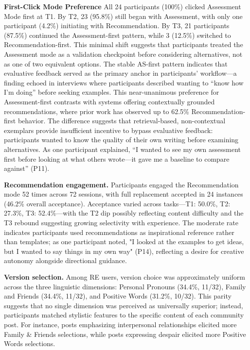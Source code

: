 \documentclass[]{llncs}
\begin{document}
\textbf{First-Click Mode Preference}
All 24 participants (100\%) clicked Assessment Mode first at T1. By T2, 23 (95.8\%) still began with Assessment, with only one participant (4.2\%) initiating with Recommendation. By T3, 21 participants (87.5\%) continued the Assessment-first pattern, while 3 (12.5\%) switched to Recommendation-first. This minimal shift suggests that participants treated the Assessment mode as a validation checkpoint before considering alternatives, not as one of two equivalent options. The stable AS-first pattern indicates that evaluative feedback served as the primary anchor in participants’ workflow—a finding echoed in interviews where participants described wanting to “know how I’m doing” before seeking examples.
This near-unanimous preference for Assessment-first contrasts with systems offering contextually grounded recommendations, where prior work has observed up to 62.5\% Recommendation-first behavior. The difference suggests that retrieval-based, non-contextual exemplars provide insufficient incentive to bypass evaluative feedback: participants wanted to know the quality of their own writing before examining alternatives. As one participant explained, “I wanted to see my own assessment first before looking at what others wrote—it gave me a baseline to compare against” (P11).

\textbf{Recommendation engagement.} Participants engaged the Recommendation mode 52 times across 72 sessions, with full replacement accepted in 24 instances (46.2\% overall acceptance). Acceptance varied across tasks—T1: 50.0\%, T2: 27.3\%, T3: 52.4\%—with the T2 dip possibly reflecting content difficulty and the T3 rebound suggesting growing selectivity with experience. The moderate rate indicates participants used recommendations as inspirational reference rather than templates; as one participant noted, "I looked at the examples to get ideas, but I wanted to say things in my own way" (P14), reflecting a desire for creative autonomy alongside directional guidance.

\textbf{Version selection.} Among RE users, version choice was approximately uniform across the three linguistic dimensions: Personal Pronouns (34.4\%, 11/32), Family and Friends (34.4\%, 11/32), and Positive Words (31.2\%, 10/32). This parity suggests that no single dimension was perceived as universally superior; instead, participants matched stylistic features to the specific content of each community post. For instance, posts emphasizing interpersonal relationships elicited more Family \& Friends selections, while posts expressing despair elicited more Positive Words selections.
\end{document}
